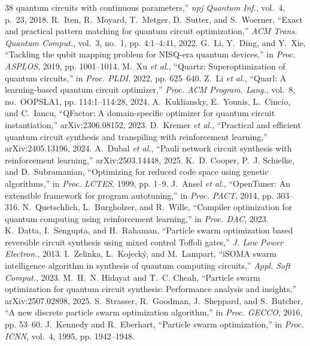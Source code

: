 \documentclass[conference,letterpaper]{IEEEtran}
\begin{document}
\begin{thebibliography}{38}
quantum circuits with continuous parameters,'' \emph{npj Quantum Inf.}, vol.~4, p.~23, 2018.
 R.~Iten, R.~Moyard, T.~Metger, D.~Sutter, and S.~Woerner, ``Exact and practical pattern
matching for quantum circuit optimization,'' \emph{ACM Trans. Quantum Comput.}, vol.~3, no.~1, pp.
4:1--4:41, 2022.
 G.~Li, Y.~Ding, and Y.~Xie, ``Tackling the qubit mapping problem for NISQ-era quantum
devices,'' in \emph{Proc. ASPLOS}, 2019, pp. 1001--1014.
 M.~Xu \emph{et al.}, ``Quartz: Superoptimization of quantum circuits,'' in \emph{Proc.
PLDI}, 2022, pp. 625--640.
 Z.~Li \emph{et al.}, ``Quarl: A learning-based quantum circuit optimizer,'' \emph{Proc. ACM
Program. Lang.}, vol.~8, no.~OOPSLA1, pp. 114:1--114:28, 2024.
 A.~Kukliansky, E.~Younis, L.~Cincio, and C.~Iancu, ``QFactor: A domain-specific optimizer
for quantum circuit instantiation,'' arXiv:2306.08152, 2023.
 D.~Kremer \emph{et al.}, ``Practical and efficient quantum circuit synthesis and
transpiling with reinforcement learning,'' arXiv:2405.13196, 2024.
 A.~Dubal \emph{et al.}, ``Pauli network circuit synthesis with reinforcement
learning,'' arXiv:2503.14448, 2025.
 K.~D. Cooper, P.~J. Schielke, and D.~Subramanian, ``Optimizing for reduced code space
using genetic algorithms,'' in \emph{Proc. LCTES}, 1999, pp. 1--9.
 J.~Ansel \emph{et al.}, ``OpenTuner: An extensible framework for program autotuning,''
in \emph{Proc. PACT}, 2014, pp. 303--316.
 N.~Quetschlich, L.~Burgholzer, and R.~Wille, ``Compiler optimization for quantum
computing using reinforcement learning,'' in \emph{Proc. DAC}, 2023.
 K.~Datta, I.~Sengupta, and H.~Rahaman, ``Particle swarm optimization based reversible
circuit synthesis using mixed control Toffoli gates,'' \emph{J. Low Power Electron.}, 2013.
 I.~Zelinka, L.~Kojeck\'y, and M.~Lampart, ``iSOMA swarm intelligence algorithm in
synthesis of quantum computing circuits,'' \emph{Appl. Soft Comput.}, 2023.
 M.~H.~N. Hidayat and T.~C. Cheah, ``Particle swarm optimization for quantum circuit
synthesis: Performance analysis and insights,'' arXiv:2507.02898, 2025.
 S.~Strasser, R.~Goodman, J.~Sheppard, and S.~Butcher, ``A new discrete particle swarm
optimization algorithm,'' in \emph{Proc. GECCO}, 2016, pp. 53--60.
 J.~Kennedy and R.~Eberhart, ``Particle swarm optimization,'' in \emph{Proc. ICNN},
vol.~4, 1995, pp. 1942--1948.

\end{thebibliography}
\end{document}

